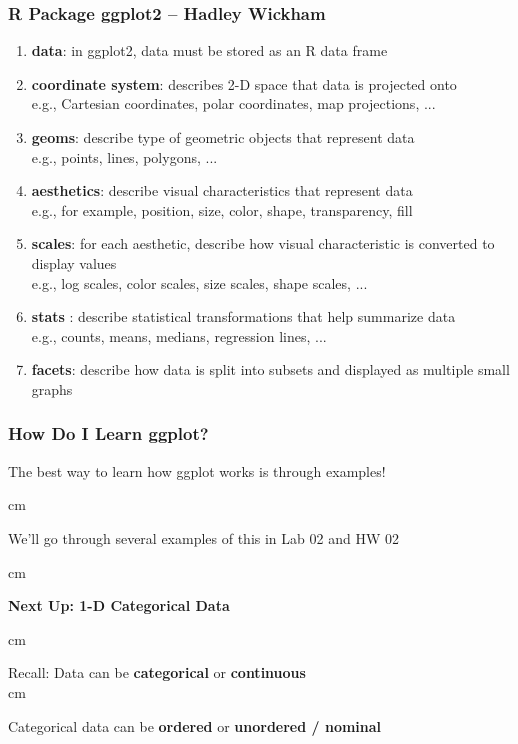 \documentclass{beamer} %
\begin{document}
\begin{frame}\frametitle{R Package ggplot2 -- Hadley Wickham}
	\small
	
	
	\begin{enumerate}
		\item \textbf{data}: in ggplot2, data must be stored as an R data frame
		
		\item \textbf{coordinate system}: describes 2-D space that data is projected onto\\
		e.g., Cartesian coordinates, polar coordinates, map projections, ...
		\item \textbf{geoms}: describe type of geometric objects that represent data\\
		e.g., points, lines, polygons, ...
		\item \textbf{aesthetics}: describe visual characteristics that represent data\\
		e.g., for example, position, size, color, shape, transparency, fill
		\item \textbf{scales}: for each aesthetic, describe how visual characteristic is converted to display values\\
		e.g., log scales, color scales, size scales, shape scales, ...
		\item \textbf{stats} : describe statistical transformations that help summarize data\\
		e.g., counts, means, medians, regression lines, ...
		\item \textbf{facets}: describe how data is split into subsets and displayed as multiple small graphs\\
	\end{enumerate}
	
	
\end{frame}


\begin{frame}\frametitle{How Do I Learn ggplot?}
	\small
	
	The best way to learn how ggplot works is through examples!
	
	 cm
	
	We'll go through several examples of this in Lab 02 and HW 02
	
	 cm
	
	\large{\textbf{Next Up:  1-D Categorical Data}}
	
	 cm
	
	Recall:  Data can be \textbf{categorical} or \textbf{continuous}\\
	
	 cm
	
	Categorical data can be \textbf{ordered} or \textbf{unordered / nominal}
	
\end{frame}
\end{document}
